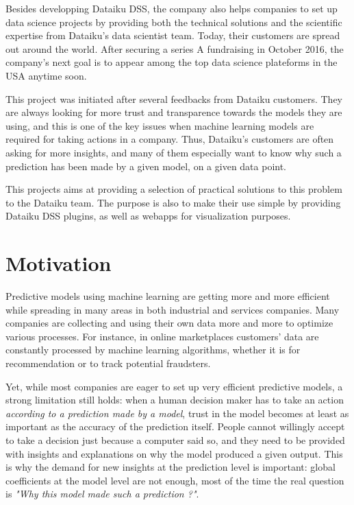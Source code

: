 \documentclass[a4paper,11pt]{kth-mag}
\begin{document}
Besides developping Dataiku DSS, the company also helps companies to set up data science projects by providing both the technical solutions and the scientific expertise from Dataiku's data scientist team. Today, their customers are spread out around the world. After securing a series A fundraising in October 2016, the company's next goal is to appear among the top data science plateforms in the USA anytime soon.

This project was initiated after several feedbacks from Dataiku customers. They are always looking for more trust and transparence towards the models they are using, and this is one of the key issues when machine learning models are required for taking actions in a company. Thus, Dataiku's customers are often asking for more insights, and many of them especially want to know why such a prediction has been made by a given model, on a given data point.

This projects aims at providing a selection of practical solutions to this problem to the Dataiku team. The purpose is also to make their use simple by providing Dataiku DSS plugins, as well as webapps for visualization purposes.

\section{Motivation}

Predictive models using machine learning are getting more and more efficient while spreading in many areas in both industrial and services companies. Many companies are collecting and using their own data more and more to optimize various processes. For instance, in online marketplaces customers' data are constantly processed by machine learning algorithms, whether it is for recommendation or to track potential fraudsters.

Yet, while most companies are eager to set up very efficient predictive models, a strong limitation still holds: when a human decision maker has to take an action \textit{according to a prediction made by a model}, trust in the model becomes at least as important as the accuracy of the prediction itself. People cannot willingly accept to take a decision just because a computer said so, and they need to be provided with insights and explanations on why the model produced a given output. This is why the demand for new insights at the prediction level is important: global coefficients at the model level are not enough, most of the time the real question is \textit{"Why this model made such a prediction ?"}.
\end{document}
